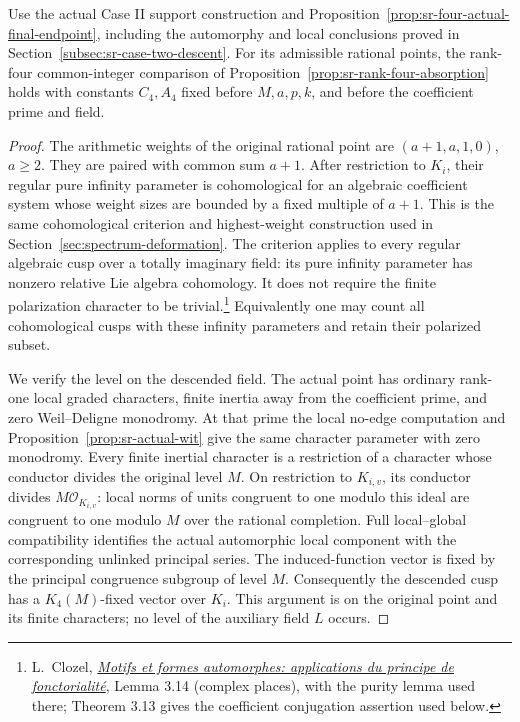 \begin{srproposition}\label{prop:sr-rank-four-fixed-integer}
Use the actual Case II support construction and
Proposition~\ref{prop:sr-four-actual-final-endpoint},
including the automorphy and local conclusions proved in
Section~\ref{subsec:sr-case-two-descent}.
For its admissible rational points, the rank-four
common-integer comparison of
Proposition~\ref{prop:sr-rank-four-absorption}
holds with constants \(C_4,A_4\) fixed before
\(M,a,p,k\), and before the coefficient prime and field.
\end{srproposition}
\begin{proof}
The arithmetic weights of the original rational point are
\((a+1,a,1,0)\), \(a\ge2\).
They are paired with common sum \(a+1\).
After restriction to \(K_i\), their regular pure infinity
parameter is cohomological for an algebraic coefficient
system whose weight sizes are bounded by a fixed multiple
of \(a+1\).
This is the same cohomological criterion and highest-weight
construction used in Section~\ref{sec:spectrum-deformation}.
The criterion applies to every regular algebraic cusp
over a totally imaginary field: its pure infinity
parameter has nonzero relative Lie algebra cohomology.
It does not require the finite polarization character
to be trivial.\footnote{L.~Clozel,
\href{https://www.jmilne.org/math/Books/AA1988a.pdf}
{\emph{Motifs et formes automorphes: applications du
principe de fonctorialit\'e}}, Lemma 3.14 (complex places),
with the purity lemma used there; Theorem 3.13 gives
the coefficient conjugation assertion used below.}
Equivalently one may count all cohomological cusps with
these infinity parameters and retain their polarized subset.

We verify the level on the descended field.
The actual point has ordinary rank-one local graded
characters, finite inertia away from the coefficient prime,
and zero Weil--Deligne monodromy.
At that prime the local no-edge computation and
Proposition~\ref{prop:sr-actual-wit} give the same
character parameter with zero monodromy.
Every finite inertial character is a restriction of a
character whose conductor divides the original level \(M\).
On restriction to \(K_{i,v}\), its conductor divides
\(M\mathcal O_{K_{i,v}}\):
local norms of units congruent to one modulo this ideal
are congruent to one modulo \(M\) over the rational
completion.
Full local--global compatibility identifies the actual
automorphic local component with the corresponding
unlinked principal series.
The induced-function vector is fixed by the principal
congruence subgroup of level \(M\).
Consequently the descended cusp has a \(K_4(M)\)-fixed
vector over \(K_i\).
This argument is on the original point and its finite
characters; no level of the auxiliary field \(L\) occurs.


\end{proof}
